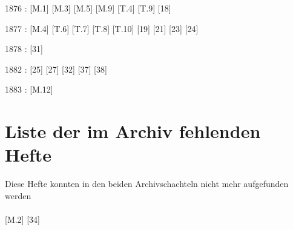 1876 : [M.1] [M.3] [M.5] [M.9] [T.4] [T.9] [18]

1877 : [M.4] [T.6] [T.7] [T.8] [T.10] [19] [21] [23] [24]

1878 : [31]

1882 : [25] [27] [32] [37] [38]

1883 : [M.12]


\chapter{Liste der im Archiv fehlenden Hefte}\label{AHfehlend}
Diese Hefte konnten in den beiden Archivschachteln nicht mehr aufgefunden werden\\
\\{}
[M.2] [34] 


